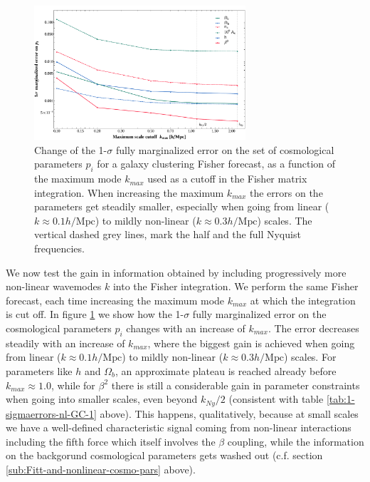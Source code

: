 \begin{figure}[h]
\centering{}
\includegraphics[width=0.7\textwidth]{Chapters/fitting-funcs/figures/kmaxvariationGC-sigmav}
\protect\protect
\caption[Effect of non-linear scales on the 1$\sigma$ errors on cosmological parameters.]{\label{fig:kmax-change-lin-nonlin} 
Change of the 1-$\sigma$ fully
marginalized error on the set of cosmological parameters $p_{i}$
for a galaxy clustering Fisher forecast, as a function of the maximum
mode $k_{max}$ used as a cutoff in the Fisher matrix integration.
When increasing the maximum $k_{max}$ the errors on the parameters
get steadily smaller, especially when going from linear ($k\approx0.1h/\mbox{Mpc}$)
to mildly non-linear ($k\approx0.3h/\mbox{Mpc}$) scales. The vertical
dashed grey lines, mark the half and the full Nyquist frequencies.}
\end{figure}


We now test the gain in information obtained by including progressively
more non-linear wavemodes $k$ into the Fisher integration. We perform
the same Fisher forecast, each time increasing the maximum mode $k_{max}$
at which the integration is cut off. In figure \ref{fig:kmax-change-lin-nonlin}
we show how the 1-$\sigma$ fully marginalized error on the cosmological
parameters $p_{i}$ changes with an increase of $k_{max}$. The error
decreases steadily with an increase of $k_{max}$, where the biggest
gain is achieved when going from linear ($k\approx0.1h/\mbox{Mpc}$)
to mildly non-linear ($k\approx0.3h/\mbox{Mpc}$) scales. For parameters
like $h$ and $\Omega_{b}$, an approximate plateau is reached already
before $k_{max}\approx1.0$, while for $\beta^{2}$ there is still
a considerable gain in parameter constraints when going into smaller
scales, even beyond $k_{Ny}/2$ (consistent with table \ref{tab:1-sigmaerrors-nl-GC-1}
above). This happens, qualitatively, because at small scales we have
a well-defined characteristic signal coming from non-linear interactions
including the fifth force which itself involves the $\beta$ coupling,
while the information on the backgorund cosmological parameters gets
washed out (c.f. section \ref{sub:Fitt-and-nonlinear-cosmo-pars}
above).

